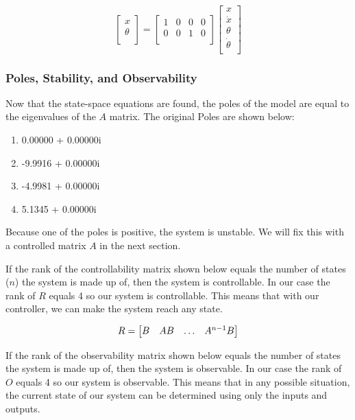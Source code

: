 \documentclass{article}
\begin{document}
\begin{equation}
\label{ss2}
\begin{bmatrix}
x\\
\theta \\
\end{bmatrix} =
\begin{bmatrix}
1&0&0&0\\
0&0&1&0\\
\end{bmatrix}
\begin{bmatrix}
x\\
\dot{x}\\
\theta\\
\dot{\theta}\\
\end{bmatrix}
\end{equation}

\subsubsection{Poles, Stability, and Observability}
Now that the state-space equations are found, the poles of the model are equal to the eigenvalues of the $A$ matrix. The original Poles are shown below:
\begin{enumerate}
  \item   0.00000 + 0.00000i
  \item -9.9916 + 0.00000i
  \item -4.9981 + 0.00000i
  \item 5.1345 + 0.00000i
\end{enumerate}
Because one of the poles is positive, the system is unstable. We will fix this with a controlled matrix $A$ in the next section.

If the rank of the controllability matrix shown below equals the number of states ($n$) the system is made up of, then the system is controllable. In our case the rank of $R$ equals 4 so our system is controllable. This means that with our controller, we can make the system reach any state.

\begin{equation} 
\label{ctrb}
\centering
R = \begin{bmatrix}
	B&AB&\hdots&A^{n-1}B\\
	\end{bmatrix}
\end{equation}
 
 If the rank of the observability matrix shown below equals the number of states the system is made up of, then the system is observable. In our case the rank of $O$ equals 4 so our system is observable. This means that in any possible situation, the current state of our system can be determined using only the inputs and outputs.
 
\end{document}
